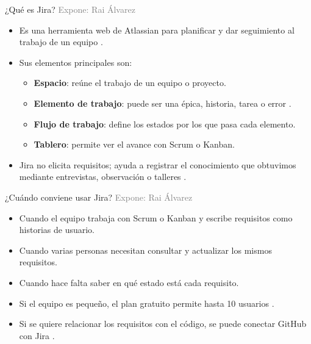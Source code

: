 \documentclass[aspectratio=169,11pt]{beamer}
\newcommand{\expone}[1]{\hfill{\scriptsize\textcolor{gray}{Expone: #1}}}
\begin{document}
\begin{frame}{¿Qué es Jira?}
  \expone{Rai Álvarez}
  \begin{itemize}
    \item Es una herramienta web de Atlassian para planificar y dar seguimiento
          al trabajo de un equipo \cite{atlassianplans}.
    \item Sus elementos principales son:
      \begin{itemize}
        \item \textbf{Espacio}: reúne el trabajo de un equipo o proyecto.
        \item \textbf{Elemento de trabajo}: puede ser una épica, historia,
              tarea o error \cite{atlassianwork}.
        \item \textbf{Flujo de trabajo}: define los estados por los que pasa
              cada elemento.
        \item \textbf{Tablero}: permite ver el avance con Scrum o Kanban.
      \end{itemize}
    \item Jira no elicita requisitos; ayuda a registrar el conocimiento que
          obtuvimos mediante entrevistas, observación o talleres
          \cite{ireb2026}.
  \end{itemize}
\end{frame}

\begin{frame}{¿Cuándo conviene usar Jira?}
  \expone{Rai Álvarez}
  \begin{itemize}
    \item Cuando el equipo trabaja con Scrum o Kanban y escribe requisitos
          como historias de usuario.
    \item Cuando varias personas necesitan consultar y actualizar los mismos
          requisitos.
    \item Cuando hace falta saber en qué estado está cada requisito.
    \item Si el equipo es pequeño, el plan gratuito permite hasta 10 usuarios
          \cite{atlassianplans}.
    \item Si se quiere relacionar los requisitos con el código, se puede
          conectar GitHub con Jira \cite{atlassiangithub}.
  \end{itemize}
\end{frame}
\end{document}
